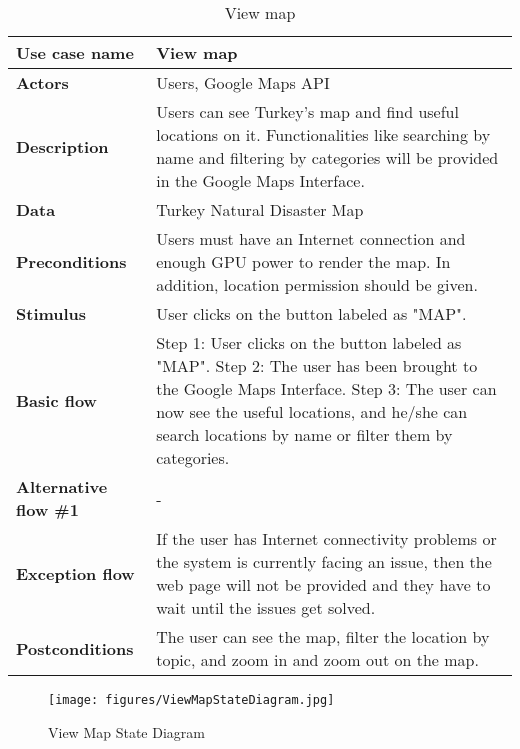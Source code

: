 \documentclass[listof=nochaptergap]{report}
\begin{document}
        \begin{table}[H]
        \centering
         \begin{tabular}{| p{4cm} | p{10cm} |} 
         \hline
         \textbf{Use case name} & View map \\
         \hline
         \textbf{Actors} & Users, Google Maps API \\
         \hline
         \textbf{Description} & Users can see Turkey's map and find useful locations on it. Functionalities like searching by name and filtering by categories will be provided in the Google Maps Interface. \\
         \hline
         \textbf{Data} & Turkey Natural Disaster Map \\
         \hline
         \textbf{Preconditions} & Users must have an Internet connection and enough GPU power to render the map. In addition, location permission should be given. \\
         \hline
         \textbf{Stimulus} & User clicks on the button labeled as "MAP". \\
         \hline
         \textbf{Basic flow} & Step 1: User clicks on the button labeled as "MAP". \newline Step 2: The user has been brought to the Google Maps Interface. \newline Step 3: The user can now see the useful locations, and he/she can search locations by name or filter them by categories. \\
         \hline
         \textbf{Alternative flow \#1} & - \\
         \hline
         \textbf{Exception flow} & If the user has Internet connectivity problems or the system is currently facing an issue, then the web page will not be provided and they have to wait until the issues get solved. \\
         \hline
         \textbf{Postconditions} & The user can see the map, filter the location by topic, and zoom in and zoom out on the map. \\
         \hline
         \end{tabular}
        \caption{View map}
        \label{tab:table13}
    \end{table}

        \begin{center}
            \begin{figure}[H]
                \centering
                \texttt{[image: figures/ViewMapStateDiagram.jpg]}
                \caption{View Map State Diagram} 
                \label{fig:figure1}
            \end{figure}
        \end{center}
\end{document}
